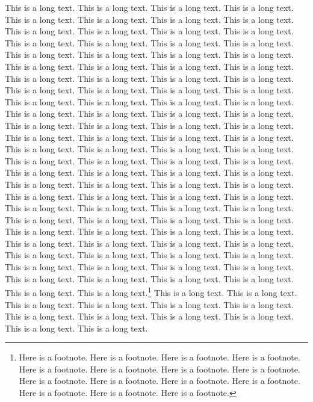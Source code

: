 \documentclass[twoside]{article}
\begin{document}
This is a long text. This is a long text.
This is a long text. This is a long text.
This is a long text. This is a long text.
This is a long text. This is a long text.
This is a long text. This is a long text.
This is a long text. This is a long text.
This is a long text. This is a long text.
This is a long text. This is a long text.
This is a long text. This is a long text.
This is a long text. This is a long text.
This is a long text. This is a long text.
This is a long text. This is a long text.
This is a long text. This is a long text.
This is a long text. This is a long text.
This is a long text. This is a long text.
This is a long text. This is a long text.
This is a long text. This is a long text.
This is a long text. This is a long text.
This is a long text. This is a long text.
This is a long text. This is a long text.
This is a long text. This is a long text.
This is a long text. This is a long text.
This is a long text. This is a long text.
This is a long text. This is a long text.
This is a long text. This is a long text.
This is a long text. This is a long text.
This is a long text. This is a long text.
This is a long text. This is a long text.
This is a long text. This is a long text.
This is a long text. This is a long text.
This is a long text. This is a long text.
This is a long text. This is a long text.
This is a long text. This is a long text.
This is a long text. This is a long text.
This is a long text. This is a long text.
This is a long text. This is a long text.
This is a long text. This is a long text.
This is a long text. This is a long text.
This is a long text. This is a long text.
This is a long text. This is a long text.
This is a long text. This is a long text.
This is a long text. This is a long text.
This is a long text. This is a long text.
This is a long text. This is a long text.
This is a long text. This is a long text.
This is a long text. This is a long text.
This is a long text. This is a long text.
This is a long text. This is a long text.
This is a long text. This is a long text.\footnote{%
  Here is a footnote. Here is a footnote.
  Here is a footnote. Here is a footnote.
  Here is a footnote. Here is a footnote.
  Here is a footnote. Here is a footnote.
  Here is a footnote. Here is a footnote.
  Here is a footnote. Here is a footnote.
  Here is a footnote. Here is a footnote.
  Here is a footnote.}
This is a long text. This is a long text.
This is a long text. This is a long text.
This is a long text. This is a long text.
This is a long text. This is a long text.
This is a long text. This is a long text.
This is a long text. This is a long text.
\end{document}
